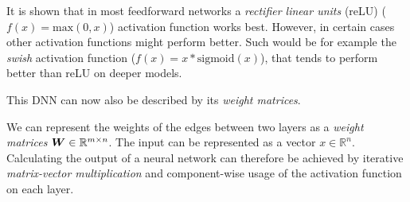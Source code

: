 It is shown that in most feedforward networks a \emph{rectifier linear units} (reLU) (\(f(x) = \text{max}(0, x)\)) activation function works best. \cite{Nair-Hinton} \cite{inproceedings}
However, in certain cases other activation functions might perform better.
Such would be for example the \emph{swish} activation function (\(f(x) = x * \text{sigmoid}(x)\)), that tends to perform better than reLU on deeper models. \cite{DBLP:journals/corr/abs-1710-05941}



This DNN  can now also be described by its \emph{weight matrices}. 

We can represent the weights of the edges between two layers as a \emph{weight matrices} \(\boldsymbol{W} \in \mathbb{R}^{m \times n}\).
The input can be represented as a vector \({x \in \mathbb{R}^n}\).
Calculating the output of a neural network can therefore be achieved by iterative \emph{matrix-vector multiplication} and component-wise usage of the activation function on each layer.


